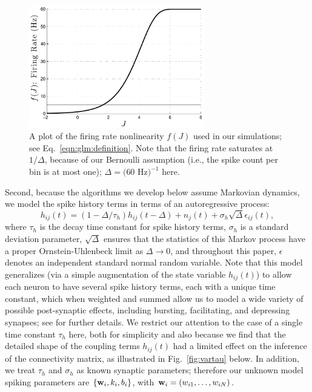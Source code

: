 \begin{figure}[t!]
\centering \includegraphics[width=3in]{../figs/fr_vs_J}
\caption{A plot of the firing rate nonlinearity $f(J)$ used in our
  simulations; see Eq.~\ref{eqn:glm:definition}.  Note that the firing
  rate saturates at $1/\Delta$, because of our Bernoulli assumption
  (i.e., the spike count per bin is at most one); $\Delta = (60$
  Hz$)^{-1}$ here.}
\label{fig:egfluor}
\end{figure}

Second, because the algorithms we develop below assume Markovian
dynamics, we model the spike history terms in terms of an
autoregressive process:
\begin{equation} \label{eqn:h:definition} 
h_{ij}(t) = (1- \Delta/\tau_h) h_{ij}(t- \Delta) +n_j(t) + \sigma_h
  \sqrt{\Delta} \epsilon_{ij}(t),
\end{equation} 
where $\tau_h$ is the decay time constant for spike history terms,
$\sigma_h$ is a standard deviation parameter, $\sqrt{\Delta}$ ensures
that the statistics of this Markov process have a proper
Ornstein-Uhlenbeck limit as $\Delta \to 0$, and throughout this paper,
$\epsilon$ denotes an independent standard normal random variable.
Note that this model generalizes (via a simple augmentation of the
state variable $h_{ij}(t)$) to allow each neuron to have several spike
history terms, each with a unique time constant, which when weighted
and summed allow us to model a wide variety of possible post-synaptic
effects, including bursting, facilitating, and depressing synapses;
see \cite{Vogelstein2009} for further details.  We restrict our
attention to the case of a single time constant $\tau_h$ here, both
for simplicity and also because we find that the detailed shape of the
coupling terms $h_{ij}(t)$ had a limited effect on the inference of
the connectivity matrix, as illustrated in Fig.~\ref{fig:vartau}
below.  In addition, we treat $\tau_h$ and $\sigma_h$ as known
synaptic parameters; therefore our unknown model spiking parameters
are $\{\mathbf{w}_i,k_i,b_i\}$, with $\mathbf{w}_i=(w_{i1},\ldots, w_{iN})$.

